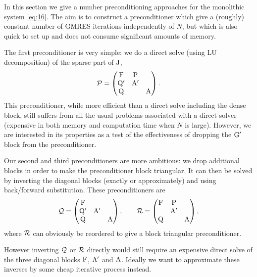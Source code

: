 In this section we give a number preconditioning approaches for the monolithic system \cref{eq:16}.
The aim is to construct a preconditioner which give a (roughly) constant number of GMRES iterations independently of $N$, but which is also quick to set up and does not consume significant amounts of memory.

The first preconditioner is very simple: we do a direct solve (using LU decomposition) of the sparse part of $\mathrm{J}$, \ie
\begin{equation}
  \mathcal{P} =
  \begin{pmatrix}
    \mathrm{F}       & \mathrm{P}     &  \\
    \mathrm{Q}'       & \mathrm{A}'    &   \\
    \mathrm{Q}       &         &   \mathrm{A}
  \end{pmatrix}.
\end{equation}
This preconditioner, while more efficient than a direct solve including the dense block, still suffers from all the usual problems associated with a direct solver (\ie expensive in both memory and computation time when $N$ is large).
However, we are interested in its properties as a test of the effectiveness of dropping the $\mathrm{G}'$ block from the preconditioner.

Our second and third preconditioners are more ambitious: we drop additional blocks in order to make the preconditioner block triangular.
It can then be solved by inverting the diagonal blocks (exactly or approximately) and using back/forward substitution.
These preconditioners are
\begin{equation}
  \mathcal{Q} =
  \begin{pmatrix}
    \mathrm{F}       &           &  \\
    \mathrm{Q}'       & \mathrm{A}'&   \\
    \mathrm{Q}       &           &   \mathrm{A}
  \end{pmatrix},
  \qquad
  \mathcal{R} =
  \begin{pmatrix}
    \mathrm{F}       & \mathrm{P}       &  \\
    & \mathrm{A}' &   \\
    \mathrm{Q}       &           &   \mathrm{A}
  \end{pmatrix},
  \label{eq:ms-block-prec-drop-p}
\end{equation}
where $\mathcal{R}$ can obviously be reordered to give a block triangular preconditioner.

However inverting $\mathcal{Q}$ or $\mathcal{R}$ directly would still require an expensive direct solve of the three diagonal blocks $\mathrm{F}$, $\mathrm{A}'$ and $\mathrm{A}$.
Ideally we want to approximate these inverses by some cheap iterative process instead.

